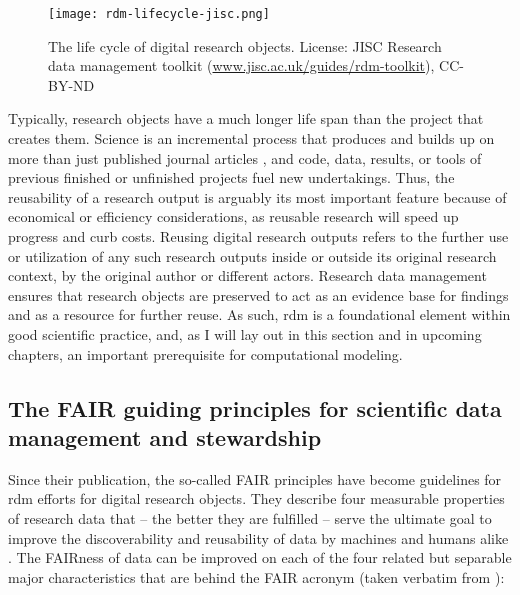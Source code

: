 \begin{figure}
	\centering
	\texttt{[image: rdm-lifecycle-jisc.png]}
	\caption[The life cycle of digital research objects]{The life cycle of digital research objects. License: JISC Research data management toolkit (\href{https://www.jisc.ac.uk/guides/rdm-toolkit}{www.jisc.ac.uk/guides/rdm-toolkit}), CC-BY-ND}
	\label{fig:rdm-lifecycle}
\end{figure}

Typically, research objects have a much longer life span than the project that creates them.
Science is an incremental process that produces and builds up on more than just published journal articles \citep{mons2018data}, and code, data, results, or tools of previous finished or unfinished projects fuel new undertakings.
Thus, the reusability of a research output is arguably its most important feature because of economical or efficiency considerations, as reusable research will speed up progress and curb costs.
Reusing digital research outputs refers to the further use or utilization of any such research outputs inside or outside its original research context, by the original author or different actors.
Research data management ensures that research objects are preserved to act as an evidence base for findings and as a resource for further reuse.
As such, \gls{rdm} is a foundational element within good scientific practice, and, as I will lay out in this section and in upcoming chapters, an important prerequisite for computational modeling.


\subsection{The FAIR guiding principles for scientific data management and stewardship}

Since their publication, the so-called \gls{FAIR} principles \citep{wilkinson2016fair} have become guidelines for \gls{rdm} efforts for digital research objects.
They describe four measurable properties of research data that -- the better they are fulfilled -- serve the ultimate goal to improve the discoverability and reusability of data by machines and humans alike \citep{wilkinson2016fair}.
The \gls{FAIR}ness of data can be improved on each of the four related but separable major characteristics that are behind the \gls{FAIR} acronym (taken verbatim from \citet{wilkinson2016fair}):

